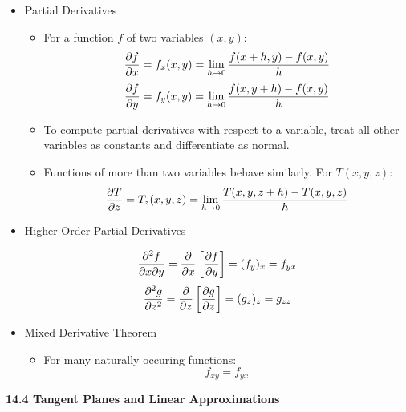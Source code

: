 \begin{itemize}

  \item Partial Derivatives
    \begin{itemize}
      \item For a function $f$ of two variables $(x,y)$:
        \[\frac{\partial f}{\partial x}=f_x(x,y)=\lim_{h\to0}\frac{f(x+h,y)-f(x,y)}{h}\]
        \[\frac{\partial f}{\partial y}=f_y(x,y)=\lim_{h\to0}\frac{f(x,y+h)-f(x,y)}{h}\]
      \item To compute partial derivatives with respect to a variable, treat all other variables as constants and differentiate as normal.
      \item Functions of more than two variables behave similarly. For $T(x,y,z)$:
        \[\frac{\partial T}{\partial z}=T_z(x,y,z)=\lim_{h\to0}\frac{T(x,y,z+h)-T(x,y,z)}{h}\]
    \end{itemize}
    
  \item Higher Order Partial Derivatives

    \[
      \frac{\partial^2 f}{\partial x\partial y} = \frac{\partial}{\partial x}\left[ \frac{\partial f}{\partial y} \right] = (f_y)_x = f_{yx}
    \] 
    \[
      \frac{\partial^2 g}{\partial z^2}= \frac{\partial}{\partial z}\left[ \frac{\partial g}{\partial z} \right]= (g_z)_z=g_{zz}
    \]
  
    \item Mixed Derivative Theorem 
      \begin{itemize}
      \item For many naturally occuring functions:
        \[f_{xy}=f_{yx}\]
      \end{itemize}
  
  

\end{itemize}

\newpage

\centerline{\bf 14.4 Tangent Planes and Linear Approximations}

